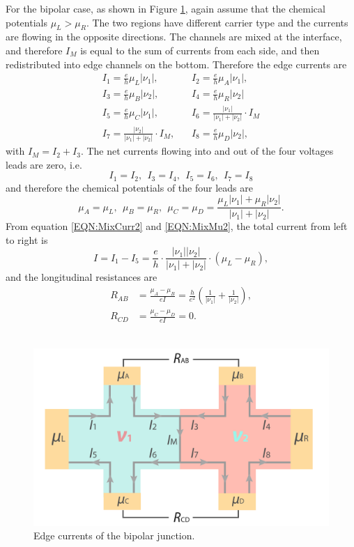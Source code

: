 \documentclass[pdflatex, sectionletters, 12pt]{pittetd}    %
\begin{document}
For the bipolar case, as shown in Figure \ref{FIG:Bipolar}, again assume that the chemical potentials $\mu_L > \mu_R$. The two regions have different carrier type and the currents are flowing in the opposite directions. The channels are mixed at the interface, and therefore $I_M$ is equal to the sum of currents from each side, and then redistributed into edge channels on the bottom. Therefore the edge currents are
\begin{equation}
\label{EQN:MixCurr2}
\begin{split}
I_1 = \frac{e}{h}\mu_L|\nu_1|, & \ \ \ \   I_2 = \frac{e}{h}\mu_A|\nu_1|, \\
I_3 = \frac{e}{h}\mu_B|\nu_2|, & \ \ \ \ I_4 = \frac{e}{h}\mu_R|\nu_2| \\
I_5 = \frac{e}{h}\mu_C|\nu_1|, & \ \ \ \  I_6 = \frac{|\nu_1|}{|\nu_1|+|\nu_2|} \cdot I_M \\
I_7 = \frac{|\nu_2|}{|\nu_1|+|\nu_2|} \cdot I_M, & \ \ \ \ I_8 = \frac{e}{h}\mu_D|\nu_2|,
\end{split}
\end{equation}
with $I_M = I_2 + I_3$. The net currents flowing into and out of the four voltages leads are zero, i.e.
$$
I_1 = I_2, \ \ I_3 = I_4, \ \ I_5 = I_6, \ \ I_7 = I_8
$$
and therefore the chemical potentials of the four leads are
\begin{equation}
\label{EQN:MixMu2}
\mu_A = \mu_L, \ \ \mu_B = \mu_R, \ \ \mu_C = \mu_D = \frac{\mu_L|\nu_1| + \mu_R|\nu_2|}{|\nu_1| + |\nu_2|}.
\end{equation}
From equation \ref{EQN:MixCurr2} and \ref{EQN:MixMu2}, the total current from left to right is 
$$
I = I_1 - I_5 = \frac{e}{h} \cdot \frac{|\nu_1||\nu_2|}{|\nu_1| + |\nu_2|} \cdot (\mu_L - \mu_R),
$$ 
and the longitudinal resistances are 
\begin{equation}
\label{EQN:Mixing2}
\begin{split}
R_{AB} & = \frac{\mu_A - \mu_B}{eI} = \frac{h}{e^2}\left(\frac{1}{|\nu_1|} + \frac{1}{|\nu_2|}\right), \\
R_{CD} & = \frac{\mu_C - \mu_D}{eI} = 0.
\end{split}
\end{equation}
\\

\begin{figure}[h!]
	\centering
	\includegraphics[width=.7\textwidth]{Drawing/Bipolar.pdf}
	\caption{Edge currents of the bipolar junction.}
	\label{FIG:Bipolar}
\end{figure}
\end{document}

